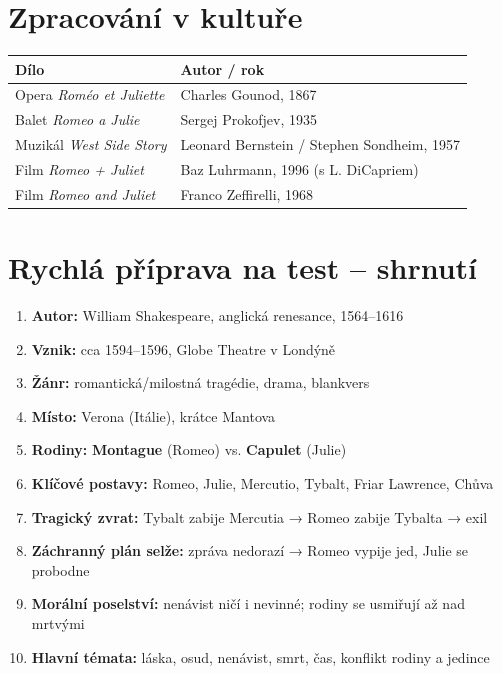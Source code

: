 \documentclass[12pt,a4paper]{article}
\begin{document}
\section{Zpracování v kultuře}

\begin{tabular}{ll}
  \toprule
  \textbf{Dílo} & \textbf{Autor / rok} \\
  \midrule
  Opera \textit{Roméo et Juliette} & Charles Gounod, 1867 \\
  Balet \textit{Romeo a Julie} & Sergej Prokofjev, 1935 \\
  Muzikál \textit{West Side Story} & Leonard Bernstein / Stephen Sondheim, 1957 \\
  Film \textit{Romeo + Juliet} & Baz Luhrmann, 1996 (s L. DiCapriem) \\
  Film \textit{Romeo and Juliet} & Franco Zeffirelli, 1968 \\
  \bottomrule
\end{tabular}

\section{Rychlá příprava na test – shrnutí}

\begin{tcolorbox}[colback=highlight, colframe=primary, coltitle=white, coltext=textmain, title=\textbf{Co si určitě zapamatovat}, fonttitle=\bfseries]
\begin{enumerate}[leftmargin=1.5em]
  \item \textbf{Autor:} William Shakespeare, anglická renesance, 1564–1616
  \item \textbf{Vznik:} cca 1594–1596, Globe Theatre v Londýně
  \item \textbf{Žánr:} romantická/milostná tragédie, drama, blankvers
  \item \textbf{Místo:} Verona (Itálie), krátce Mantova
  \item \textbf{Rodiny:} \textbf{Montague} (Romeo) vs. \textbf{Capulet} (Julie)
  \item \textbf{Klíčové postavy:} Romeo, Julie, Mercutio, Tybalt, Friar Lawrence, Chůva
  \item \textbf{Tragický zvrat:} Tybalt zabije Mercutia → Romeo zabije Tybalta → exil
  \item \textbf{Záchranný plán selže:} zpráva nedorazí → Romeo vypije jed, Julie se probodne
  \item \textbf{Morální poselství:} nenávist ničí i nevinné; rodiny se usmiřují až nad mrtvými
  \item \textbf{Hlavní témata:} láska, osud, nenávist, smrt, čas, konflikt rodiny a jedince
\end{enumerate}
\end{tcolorbox}
\end{document}
